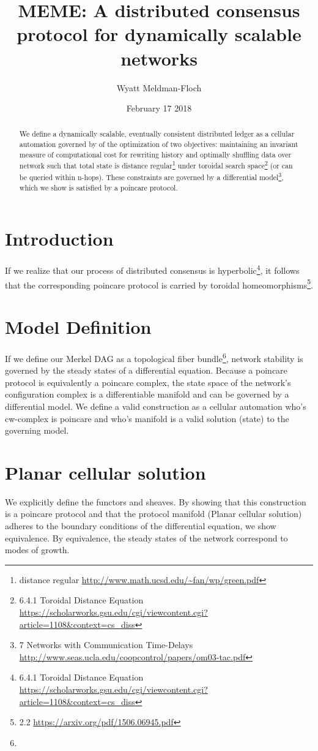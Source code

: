 \documentclass{article}
\title{MEME: A distributed consensus protocol for dynamically scalable networks}
\author{Wyatt Meldman-Floch}
\date{February 17 2018}
\begin{document}
\maketitle

\begin{abstract}
We define a dynamically scalable, eventually consistent distributed ledger as a cellular automation governed by of the optimization of two objectives: maintaining an invariant measure of computational cost for rewriting history and optimally shuffling data over network such that total state is distance regular\footnote{distance regular \url{http://www.math.ucsd.edu/~fan/wp/green.pdf}} under toroidal search space\footnote{6.4.1 Toroidal Distance Equation \url{https://scholarworks.gsu.edu/cgi/viewcontent.cgi?article=1108&context=cs_diss}} (or can be queried within n-hops). These constraints are governed by a differential model\footnote{7 Networks with Communication Time-Delays \url{http://www.seas.ucla.edu/coopcontrol/papers/om03-tac.pdf}}, which we show is satisfied by a poincare protocol.

\end{abstract}
\setcounter{secnumdepth}{0}
\section{Introduction}
If we realize that our process of distributed consensus is hyperbolic\footnote{6.4.1 Toroidal Distance Equation \url{https://scholarworks.gsu.edu/cgi/viewcontent.cgi?article=1108&context=cs_diss}}, it follows that the corresponding poincare protocol is carried by toroidal homeomorphisms\footnote{2.2 \url{https://arxiv.org/pdf/1506.06945.pdf}}.

\section{Model Definition}
If we define our Merkel DAG as a topological fiber bundle\footnote{}, network stability is governed by the steady states of a differential equation. Because a poincare protocol is equivalently a poincare complex, the state space of the network's configuration complex is a differentiable manifold and can be governed by a differential model. We define a valid construction as a cellular automation who's cw-complex is poincare and who's manifold is a valid solution (state) to the governing model. 

\section{Planar cellular solution}
We explicitly define the functors and sheaves. By showing that this construction is a poincare protocol and that the protocol manifold (Planar cellular solution) adheres to the boundary conditions of the differential equation, we show equivalence. By equivalence, the steady states of the network correspond to modes of growth.
\end{document}
